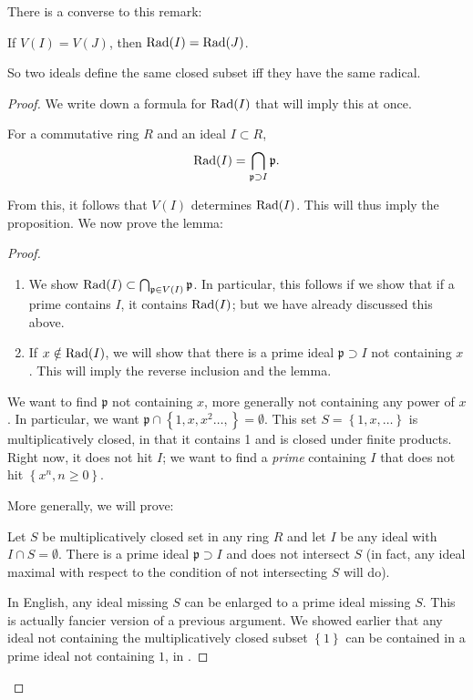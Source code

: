 There is a converse to this remark:
\begin{proposition} 
If $V(I) = V(J)$, then $\operatorname{Rad}(I) = \operatorname{Rad}(J)$. 
\end{proposition} 
So two ideals define the same closed subset iff they have the
same radical.
\begin{proof} 
We write down a formula for $\operatorname{Rad}(I)$ that will imply this at
once.
\begin{lemma} \label{radprimescontaining} For a commutative ring $R$ and an ideal $I \subset
R$,
\[ \operatorname{Rad}(I) = \bigcap_{\mathfrak{p} \supset I} \mathfrak{p}.  \]
\end{lemma} 
From this, it follows that $V(I)$ determines $\operatorname{Rad}(I)$. This
will thus imply
the proposition.  
We now prove the lemma:
\begin{proof} 
\begin{enumerate}
\item We show $\operatorname{Rad}(I) \subset \bigcap_{\mathfrak{p} \in V(I)}
\mathfrak{p} $. In
particular, this follows if we show that if a prime contains
$I$, it contains $\operatorname{Rad}(I)$; but we have already
discussed this above.  
\item If $x \notin \operatorname{Rad}(I)$, we will show that there is a prime
ideal $\mathfrak{p}
\supset I$ not containing $x$. This will imply the reverse
inclusion and the
lemma.  
\end{enumerate}


We want to find $\mathfrak{p}$ not containing $x$, more
generally not
containing any power of $x$. In particular, we want
$\mathfrak{p} \cap \left\{1,
x, x^2 \dots, \right\} = \emptyset$. This set $S = \left\{1, x,
\dots\right\}$
is multiplicatively closed, in that it contains 1 and is closed
under
finite products. Right now, it does not hit $I$; we want to find
a
\emph{prime} containing $I$ that does not hit $\left\{x^n, n
\geq 0\right\}$.


More generally, we will prove:

\begin{sublemma}\label{sublemmamultclosed}
Let $S$ be multiplicatively closed set in any ring $R$ and let
$I$ be any ideal with $I \cap S =
\emptyset$. There is a prime ideal $\mathfrak{p} \supset I$ and
does not
intersect $S$ (in fact, any ideal maximal with respect to the condition of
not intersecting $S$ will do).  
\end{sublemma}
In English, any ideal missing $S$ can be enlarged to a prime
ideal missing $S$.
This is actually fancier version of a previous argument. We
showed earlier that any ideal not
containing the multiplicatively closed subset $\left\{1\right\}$
can be
contained in a prime ideal not containing $1$, in
.


\end{proof}
\end{proof}
